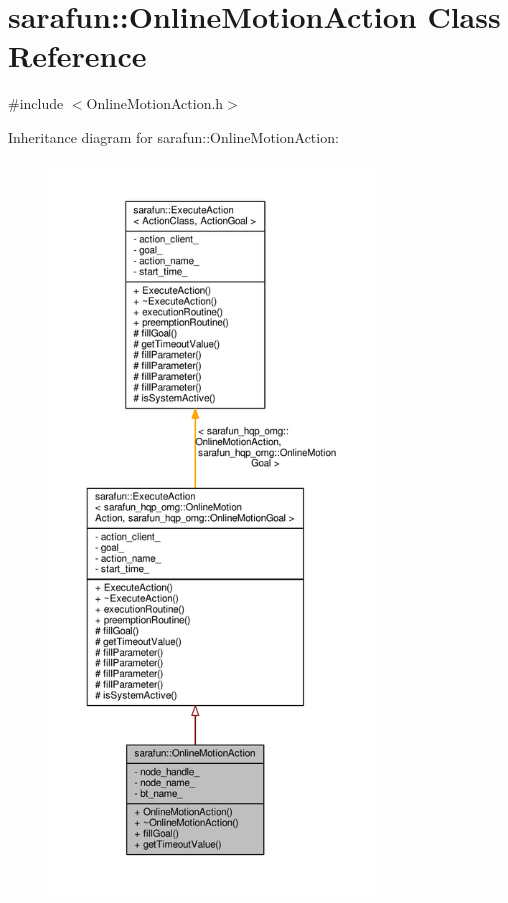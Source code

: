 \hypertarget{classsarafun_1_1OnlineMotionAction}{\section{sarafun\-:\-:Online\-Motion\-Action Class Reference}
\label{classsarafun_1_1OnlineMotionAction}
}


{\ttfamily \#include $<$Online\-Motion\-Action.\-h$>$}



Inheritance diagram for sarafun\-:\-:Online\-Motion\-Action\-:
\nopagebreak
\begin{figure}[H]
\begin{center}
\leavevmode
\includegraphics[height=550pt]{da/d89/classsarafun_1_1OnlineMotionAction__inherit__graph}
\end{center}
\end{figure}


